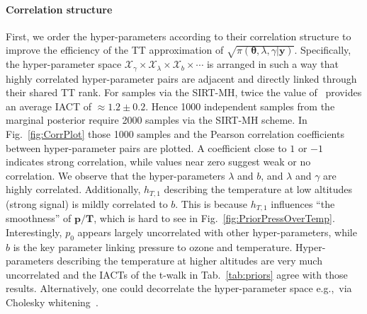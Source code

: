 \paragraph{Correlation structure}
First, we order the hyper-parameters according to their correlation structure to improve the efficiency of the TT approximation of $\sqrt{\pi( \bm{\theta},\lambda,\gamma  | \bm{y})}$. 
Specifically, the hyper-parameter space $\mathcal{X}_{\gamma} \times \mathcal{X}_{\lambda} \times \mathcal{X}_{b} \times \cdots$ is arranged in such a way that highly correlated hyper-parameter pairs are adjacent and directly linked through their shared TT rank.
For samples via the SIRT-MH, twice the value of~\cite{wolff2004monte, drikHesse} provides an average IACT of $\approx 1.2 \pm 0.2$.
Hence 1000 independent samples from the marginal posterior require 2000 samples via the SIRT-MH scheme.
In Fig.~\ref{fig:CorrPlot} those 1000 samples and the Pearson correlation coefficients between hyper-parameter pairs are plotted.
A coefficient close to $1$ or $-1$ indicates strong correlation, while values near zero suggest weak or no correlation.
We observe that the hyper-parameters $\lambda$ and $b$, and $\lambda$ and $\gamma$ are highly correlated.
Additionally, $h_{T,1}$ describing the temperature at low altitudes (strong signal) is mildly correlated to $b$.
This is because $h_{T,1}$ influences ``the smoothness'' of $\bm{p}/\bm{T}$, which is hard to see in Fig.~\ref{fig:PriorPressOverTemp}.
Interestingly, $p_0$ appears largely uncorrelated with other hyper-parameters, while $b$ is the key parameter linking pressure to ozone and temperature.
Hyper-parameters describing the temperature at higher altitudes are very much uncorrelated and the IACTs of the t-walk in Tab.~\ref{tab:priors} agree with those results.
Alternatively, one could decorrelate the hyper-parameter space e.g.,~via Cholesky whitening~\cite{KessyWhitening2018}.


